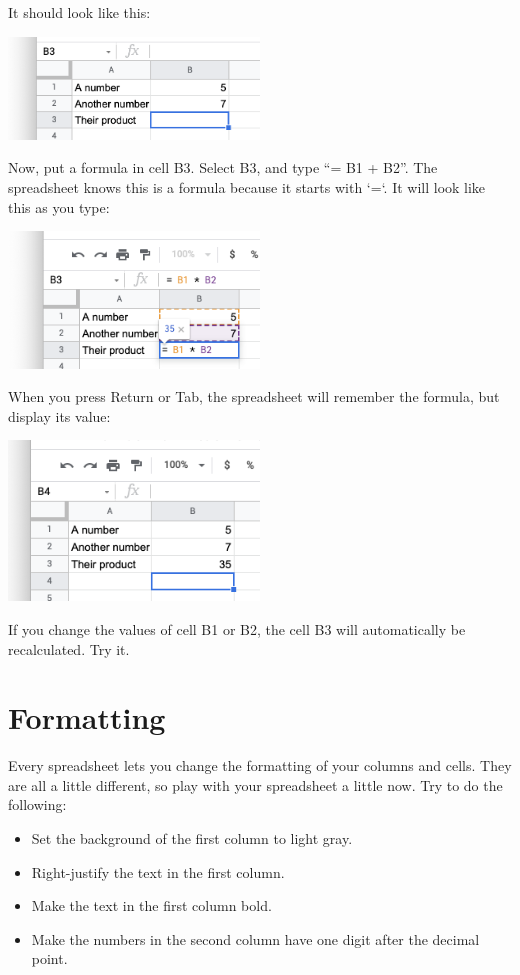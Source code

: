 It should look like this:

\includegraphics[width=0.5\textwidth]{NoFormulas.png}

Now, put a formula in cell B3. Select B3, and type ``= B1 + B2''. The spreadsheet knows this is a formula because it starts with `=`. It will look like this as you type:

\includegraphics[width=0.5\textwidth]{TypingFirstFormula.png}

When you press Return or Tab, the spreadsheet will remember the formula, but display its value:

\includegraphics[width=0.5\textwidth]{FirstCalc.png}

If you change the values of cell B1 or B2, the cell B3 will automatically be recalculated. Try it.

\section{Formatting}

Every spreadsheet lets you change the formatting of your columns and cells. They are all a little different, so play with your spreadsheet a little now. Try to do the following:
\begin{itemize}
\item Set the background of the first column to light gray.
\item Right-justify the text in the first column.
\item Make the text in the first column bold.
\item Make the numbers in the second column have one digit after the decimal point.
\end{itemize}


